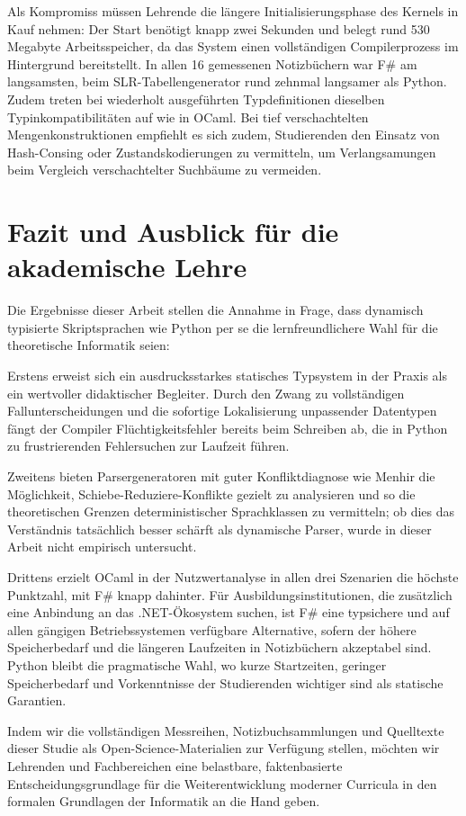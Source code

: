 Als Kompromiss müssen Lehrende die längere Initialisierungsphase des Kernels in Kauf nehmen: Der Start benötigt knapp zwei Sekunden und belegt rund 530 Megabyte Arbeitsspeicher, da das System einen vollständigen Compilerprozess im Hintergrund bereitstellt.
In allen 16 gemessenen Notizbüchern war F\# am langsamsten, beim SLR-Tabellengenerator rund zehnmal langsamer als Python.
Zudem treten bei wiederholt ausgeführten Typdefinitionen dieselben Typinkompatibilitäten auf wie in OCaml.
Bei tief verschachtelten Mengenkonstruktionen empfiehlt es sich zudem, Studierenden den Einsatz von Hash-Consing oder Zustandskodierungen zu vermitteln, um Verlangsamungen beim Vergleich verschachtelter Suchbäume zu vermeiden.

\section{Fazit und Ausblick für die akademische Lehre}
\label{sec:recommendation_conclusion}

Die Ergebnisse dieser Arbeit stellen die Annahme in Frage, dass dynamisch typisierte Skriptsprachen wie Python per se die lernfreundlichere Wahl für die theoretische Informatik seien:

Erstens erweist sich ein ausdrucksstarkes statisches Typsystem in der Praxis als ein wertvoller didaktischer Begleiter.
Durch den Zwang zu vollständigen Fallunterscheidungen und die sofortige Lokalisierung unpassender Datentypen fängt der Compiler Flüchtigkeitsfehler bereits beim Schreiben ab, die in Python zu frustrierenden Fehlersuchen zur Laufzeit führen.

Zweitens bieten Parsergeneratoren mit guter Konfliktdiagnose wie Menhir die Möglichkeit, Schiebe-Reduziere-Konflikte gezielt zu analysieren und so die theoretischen Grenzen deterministischer Sprachklassen zu vermitteln; ob dies das Verständnis tatsächlich besser schärft als dynamische Parser, wurde in dieser Arbeit nicht empirisch untersucht.

Drittens erzielt OCaml in der Nutzwertanalyse in allen drei Szenarien die höchste Punktzahl, mit F\# knapp dahinter.
Für Ausbildungsinstitutionen, die zusätzlich eine Anbindung an das .NET-Ökosystem suchen, ist F\# eine typsichere und auf allen gängigen Betriebssystemen verfügbare Alternative, sofern der höhere Speicherbedarf und die längeren Laufzeiten in Notizbüchern akzeptabel sind.
Python bleibt die pragmatische Wahl, wo kurze Startzeiten, geringer Speicherbedarf und Vorkenntnisse der Studierenden wichtiger sind als statische Garantien.

Indem wir die vollständigen Messreihen, Notizbuchsammlungen und Quelltexte dieser Studie als Open-Science-Materialien zur Verfügung stellen, möchten wir Lehrenden und Fachbereichen eine belastbare, faktenbasierte Entscheidungsgrundlage für die Weiterentwicklung moderner Curricula in den formalen Grundlagen der Informatik an die Hand geben.
